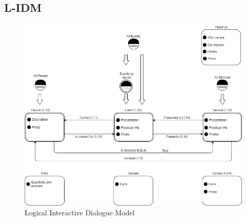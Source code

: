 \documentclass[11pt, a4paperm, hidelinks]{article}
\begin{document}
	\subsection{L-IDM}
	\begin{figure}[h!]
		\centering
		\begin{minipage}[b]{1\textwidth}
    			\includegraphics[width=\textwidth]{./assets/L-IDM.png}
			\caption{Logical Interactive Dialogue Model}
		\end{minipage}
	\end{figure}

	\clearpage
\end{document}
